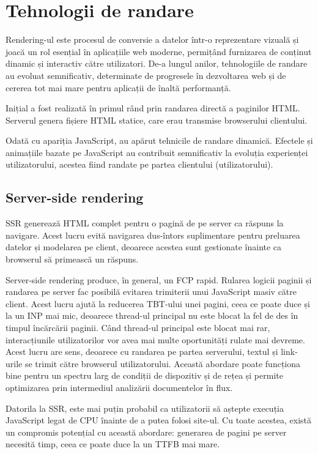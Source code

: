 \documentclass[12pt, a4paper]{report}
\begin{document}
\chapter{Tehnologii de randare}

Rendering-ul este procesul de conversie a datelor într-o reprezentare vizuală și joacă un rol esențial în aplicațiile web moderne, permițând furnizarea de conținut dinamic și interactiv către utilizatori. De-a lungul anilor, tehnologiile de randare au evoluat semnificativ, determinate de progresele în dezvoltarea web și de cererea tot mai mare pentru aplicații de înaltă performanță.

Inițial a fost realizată în primul rând prin randarea directă a paginilor HTML. Serverul genera fișiere HTML statice, care erau transmise browserului clientului.

Odată cu apariția JavaScript, au apărut tehnicile de randare dinamică. Efectele și animațiile bazate pe JavaScript au contribuit semnificativ la evoluția experienței utilizatorului, acestea fiind randate pe partea clientului (utilizatorului).

\section{Server-side rendering}

SSR generează HTML complet pentru o pagină de pe server ca răspuns la navigare. Acest lucru evită navigarea dus-întors suplimentare pentru preluarea datelor și modelarea pe client, deoarece acestea sunt gestionate înainte ca browserul să primească un răspuns.

Server-side rendering produce, în general, un FCP rapid. Rularea logicii paginii și randarea pe server fac posibilă evitarea trimiterii unui JavaScript masiv către client. Acest lucru ajută la reducerea TBT-ului unei pagini, ceea ce poate duce și la un INP mai mic, deoarece thread-ul principal nu este blocat la fel de des în timpul încărcării paginii. Când thread-ul principal este blocat mai rar, interacțiunile utilizatorilor vor avea mai multe oportunități rulate mai devreme. Acest lucru are sens, deoarece cu randarea pe partea serverului, textul și link-urile se trimit către browserul utilizatorului. Această abordare poate funcționa bine pentru un spectru larg de condiții de dispozitiv și de rețea și permite optimizarea prin intermediul analizării documentelor în flux.

Datorila la SSR, este mai puțin probabil ca utilizatorii să aștepte execuția JavaScript legat de CPU înainte de a putea folosi site-ul. Cu toate acestea, există un compromis potențial cu această abordare: generarea de pagini pe server necesită timp, ceea ce poate duce la un TTFB mai mare.
\end{document}
